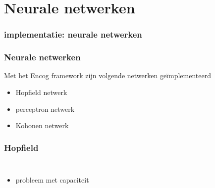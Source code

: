 \documentclass{beamer}
\begin{document}
\section{Neurale netwerken}
\begin{frame}
  \frametitle{implementatie: neurale netwerken}
  \transfade
\end{frame}
\begin{frame}
  \frametitle{Neurale netwerken}
  \transfade
  Met het Encog framework zijn volgende netwerken ge\"{i}mplementeerd
  \begin{itemize}
    \item Hopfield netwerk
    \item perceptron netwerk
    \item Kohonen netwerk
  \end{itemize}
\end{frame}
\begin{frame}
  \frametitle{Hopfield}
  \transfade
  \begin{columns}[c]
       \begin{itemize}
         \item probleem met capaciteit
       \end{itemize}
  \end{columns}
\end{frame}
\end{document}
